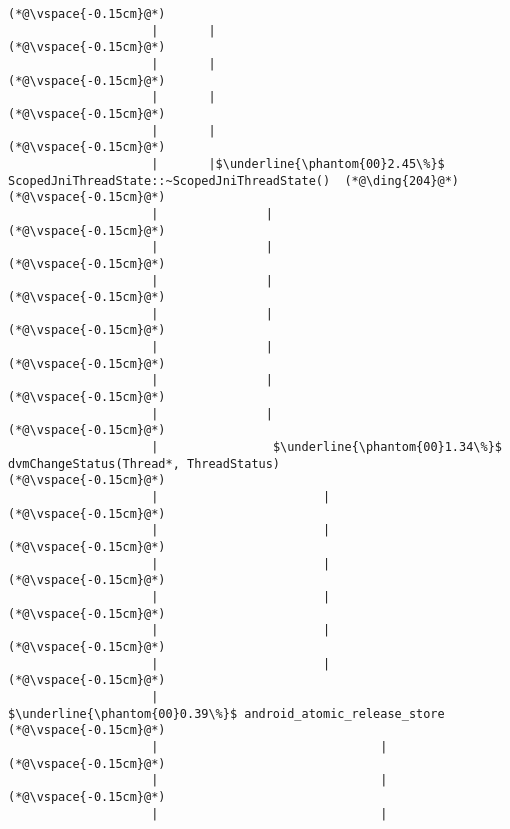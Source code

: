 \begin{lstlisting}[caption=Metodikutsu C$\to$Java 20 int-parametrilla, label=profile:C2JBenchmark00146, numberbychapter=true, frame=lines, float, floatplacement=t]
(*@\vspace{-0.15cm}@*)
                    |       |       
(*@\vspace{-0.15cm}@*)
                    |       |       
(*@\vspace{-0.15cm}@*)
                    |       |
(*@\vspace{-0.15cm}@*)
                    |       |
(*@\vspace{-0.15cm}@*)
                    |       |$\underline{\phantom{00}2.45\%}$ ScopedJniThreadState::~ScopedJniThreadState()  (*@\ding{204}@*)
(*@\vspace{-0.15cm}@*)
                    |               |
(*@\vspace{-0.15cm}@*)
                    |               |
(*@\vspace{-0.15cm}@*)
                    |               |
(*@\vspace{-0.15cm}@*)
                    |               |
(*@\vspace{-0.15cm}@*)
                    |               |
(*@\vspace{-0.15cm}@*)
                    |               |
(*@\vspace{-0.15cm}@*)
                    |               |
(*@\vspace{-0.15cm}@*)
                    |                $\underline{\phantom{00}1.34\%}$ dvmChangeStatus(Thread*, ThreadStatus)
(*@\vspace{-0.15cm}@*)
                    |                       |
(*@\vspace{-0.15cm}@*)
                    |                       |
(*@\vspace{-0.15cm}@*)
                    |                       |
(*@\vspace{-0.15cm}@*)
                    |                       |
(*@\vspace{-0.15cm}@*)
                    |                       |
(*@\vspace{-0.15cm}@*)
                    |                       |
(*@\vspace{-0.15cm}@*)
                    |                        $\underline{\phantom{00}0.39\%}$ android_atomic_release_store
(*@\vspace{-0.15cm}@*)
                    |                               |
(*@\vspace{-0.15cm}@*)
                    |                               |
(*@\vspace{-0.15cm}@*)
                    |                               |

\end{lstlisting}
